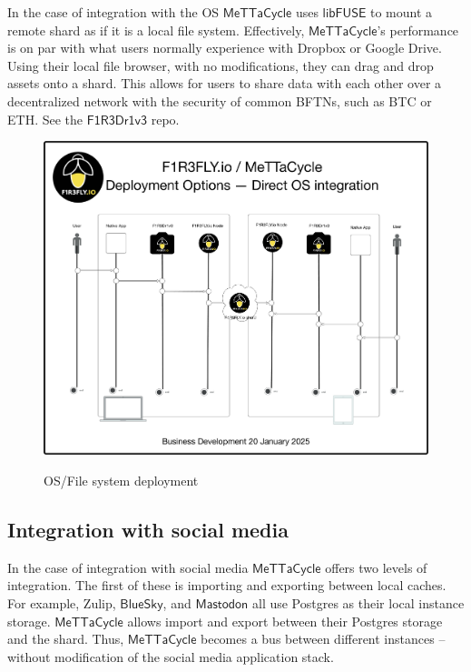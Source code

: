 \documentclass{article}
\newcommand{\MC}{\mathsf{MeTTaCycle}}
\newcommand{\FD}{\mathsf{F1R3Dr1v3}}
\begin{document}
In the case of integration with the OS $\MC$ uses
$\mathsf{libFUSE}$ to mount a remote shard as if it is a local file
system. Effectively, $\MC$'s performance is on par with what
users normally experience with Dropbox or Google Drive. Using their
local file browser, with no modifications, they can drag and drop
assets onto a shard. This allows for users to share data with each
other over a decentralized network with the security of common BFTNs,
such as BTC or ETH. See the $\FD$ repo.

\begin{figure}
  \centering
  \includegraphics[scale=0.15]{MeTTaCycleArchitecture2025OSDeployment.pdf} \\
  \caption{OS/File system deployment}
  \label{MCArch2025OSDeployment}
\end{figure}

\subsection{Integration with social media}

In the case of integration with social media $\MC$ offers two
levels of integration. The first of these is importing and exporting
between local caches. For example, Zulip, $\mathsf{BlueSky}$, and
$\mathsf{Mastodon}$ all use Postgres as their local instance
storage. $\MC$ allows import and export between their Postgres
storage and the shard. Thus, $\MC$ becomes a bus between
different instances -- without modification of the social media
application stack.
\end{document}
